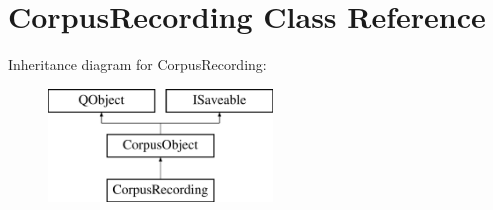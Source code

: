 \hypertarget{class_corpus_recording}{}\section{Corpus\+Recording Class Reference}
\label{class_corpus_recording}
Inheritance diagram for Corpus\+Recording\+:\begin{figure}[H]
\begin{center}
\leavevmode
\includegraphics[height=3.000000cm]{class_corpus_recording}
\end{center}
\end{figure}
